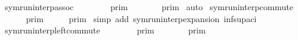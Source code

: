 \begin{isabellebody}
%
\isadelimdocument
%
\endisadelimdocument
{}\isamarkupfalse%
\ symrun{\isacharunderscore}interp{\isacharunderscore}assoc{\isacharcolon}\isanewline
\ \ {\isacartoucheopen}{\isasymlbrakk}{\isasymlbrakk}\ {\isacharparenleft}{\isasymGamma}\ {\isacharat}\ {\isasymGamma}\ {\isacharat}\ {\isasymGamma}\ {\isasymrbrakk}{\isasymrbrakk}\isactrlsub p\isactrlsub r\isactrlsub i\isactrlsub m\ {\isacharequal}\ {\isasymlbrakk}{\isasymlbrakk}\ {\isasymGamma}\ {\isacharat}\ {\isacharparenleft}{\isasymGamma}\ {\isacharat}\ {\isasymGamma}\ {\isasymrbrakk}{\isasymrbrakk}\isactrlsub p\isactrlsub r\isactrlsub i\isactrlsub m{\isacartoucheclose}\isanewline
%
\isadelimproof
%
\endisadelimproof
%
\isatagproof
{}\isamarkupfalse%
\ auto%
\endisatagproof
{\isafoldproof}%
%
\isadelimproof
\isanewline
%
\endisadelimproof
\isanewline
{}\isamarkupfalse%
\ symrun{\isacharunderscore}interp{\isacharunderscore}commute{\isacharcolon}\isanewline
\ \ {\isacartoucheopen}{\isasymlbrakk}{\isasymlbrakk}\ {\isasymGamma}\ {\isacharat}\ {\isasymGamma}\ {\isasymrbrakk}{\isasymrbrakk}\isactrlsub p\isactrlsub r\isactrlsub i\isactrlsub m\ {\isacharequal}\ {\isasymlbrakk}{\isasymlbrakk}\ {\isasymGamma}\ {\isacharat}\ {\isasymGamma}\ {\isasymrbrakk}{\isasymrbrakk}\isactrlsub p\isactrlsub r\isactrlsub i\isactrlsub m{\isacartoucheclose}\isanewline
%
\isadelimproof
%
\endisadelimproof
%
\isatagproof
{}\isamarkupfalse%
\ {\isacharparenleft}simp\ add{\isacharcolon}\ symrun{\isacharunderscore}interp{\isacharunderscore}expansion\ inf{\isacharunderscore}sup{\isacharunderscore}aci{\isacharparenleft}{}{\isacharparenright}{\isacharparenright}%
\endisatagproof
{\isafoldproof}%
%
\isadelimproof
\isanewline
%
\endisadelimproof
\isanewline
{}\isamarkupfalse%
\ symrun{\isacharunderscore}interp{\isacharunderscore}left{\isacharunderscore}commute{\isacharcolon}\isanewline
\ \ {\isacartoucheopen}{\isasymlbrakk}{\isasymlbrakk}\ {\isasymGamma}\ {\isacharat}\ {\isacharparenleft}{\isasymGamma}\ {\isacharat}\ {\isasymGamma}\ {\isasymrbrakk}{\isasymrbrakk}\isactrlsub p\isactrlsub r\isactrlsub i\isactrlsub m\ {\isacharequal}\ {\isasymlbrakk}{\isasymlbrakk}\ {\isasymGamma}\ {\isacharat}\ {\isacharparenleft}{\isasymGamma}\ {\isacharat}\ {\isasymGamma}\ {\isasymrbrakk}{\isasymrbrakk}\isactrlsub p\isactrlsub r\isactrlsub i\isactrlsub m{\isacartoucheclose}\isanewline

\end{isabellebody}
